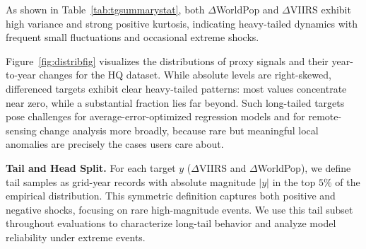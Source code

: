 \documentclass[preprint,12pt]{elsarticle}
\begin{document}
As shown in Table~\ref{tab:tgsummarystat}, both $\Delta$WorldPop and $\Delta$VIIRS exhibit high variance and strong positive kurtosis, indicating heavy-tailed dynamics with frequent small fluctuations and occasional extreme shocks.


\begin{table}[htbp]
    \centering
    \caption{Target summary statistics (part 1)}
    \label{tab:tgsummarystat_1}
\end{table}
\vspace{-0.4cm}
\begin{table}[htbp]
    \centering
    \caption{Target summary statistics}
    \label{tab:tgsummarystat}
\end{table}

Figure~\ref{fig:distribfig} visualizes the distributions of proxy signals and their year-to-year changes for the HQ dataset. While absolute levels are right-skewed, differenced targets exhibit clear heavy-tailed patterns: most values concentrate near zero, while a substantial fraction lies far beyond. Such long-tailed targets pose challenges for average-error-optimized regression models and for remote-sensing change analysis more broadly, because rare but meaningful local anomalies are precisely the cases users care about.

\textbf{Tail and Head Split.} For each target $y$ ($\Delta$VIIRS and $\Delta$WorldPop), we define tail samples as grid-year records with absolute magnitude $|y|$ in the top $5\%$ of the empirical distribution. This symmetric definition captures both positive and negative shocks, focusing on rare high-magnitude events. We use this tail subset throughout evaluations to characterize long-tail behavior and analyze model reliability under extreme events.
\end{document}
